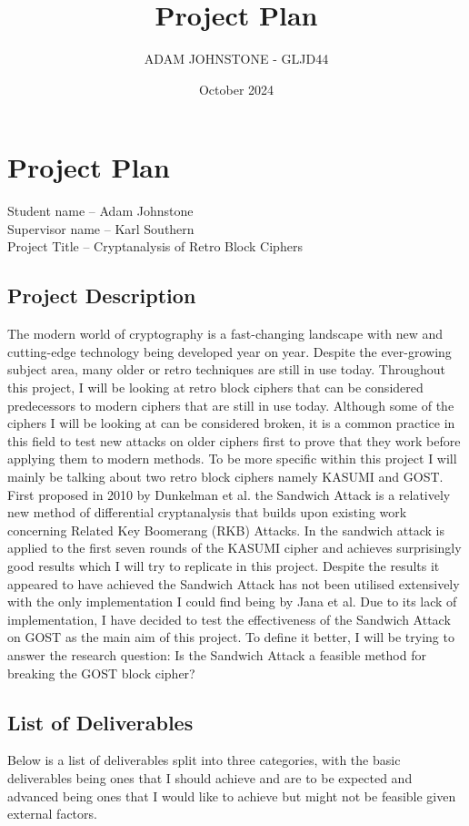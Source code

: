 \documentclass{article}
\title{Project Plan}
\author{ADAM JOHNSTONE - GLJD44}
\date{October 2024}
\begin{document}
\maketitle
\section{Project Plan}
Student name – Adam Johnstone\\
Supervisor name – Karl Southern\\
Project Title – Cryptanalysis of Retro Block Ciphers
\subsection{Project Description}
The modern world of cryptography is a fast-changing landscape with new and cutting-edge technology being developed year on year. Despite the ever-growing subject area, many older or retro techniques are still in use today. Throughout this project, I will be looking at retro block ciphers that can be considered predecessors to modern ciphers that are still in use today. Although some of the ciphers I will be looking at can be considered broken, it is a common practice in this field to test new attacks on older ciphers first to prove that they work before applying them to modern methods. To be more specific within this project I will mainly be talking about two retro block ciphers namely KASUMI and GOST.
First proposed in 2010 by  Dunkelman et al. \cite{C:DunKelSha10} the Sandwich Attack is a relatively new method of differential cryptanalysis that builds upon existing work concerning Related Key Boomerang (RKB) Attacks. In \cite{C:DunKelSha10} the sandwich attack is applied to the first seven rounds of the KASUMI cipher and achieves surprisingly good results which I will try to replicate in this project. Despite the results it appeared to have achieved the Sandwich Attack has not been utilised extensively with the only implementation I could find being by Jana et al.\cite{DBLP:journals/iacr/JanaRSP23} Due to its lack of implementation, I have decided to test the effectiveness of the Sandwich Attack on GOST as the main aim of this project. To define it better, I will be trying to answer the research question: Is the Sandwich Attack a feasible method for breaking the GOST block cipher?
\subsection{List of Deliverables}
Below is a list of deliverables split into three categories, with the basic deliverables being ones that I should achieve and are to be expected and advanced being ones that I would like to achieve but might not be feasible given external factors.
\end{document}
